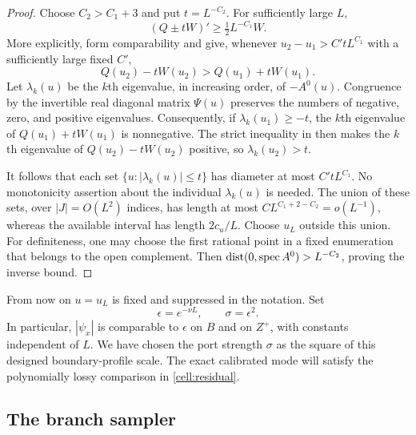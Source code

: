 \begin{proof}
Choose $C_2>C_1+3$ and put $t=L^{-C_2}$.  For sufficiently large $L$,
\[
 (Q\pm tW)'\ge\tfrac12 L^{-C_1}W.
\]
More explicitly, form comparability and 
give, whenever $u_2-u_1>C'tL^{C_1}$ with a sufficiently large fixed $C'$,
\begin{equation}
 Q(u_2)-tW(u_2)>Q(u_1)+tW(u_1).
 \label{cell:inertia-comparison}
\end{equation}
Let $\lambda_k(u)$ be the $k$th eigenvalue, in increasing order, of
$-A^0(u)$.  Congruence by the invertible real diagonal matrix $\Psi(u)$
preserves the numbers of negative, zero, and positive eigenvalues.
Consequently, if $\lambda_k(u_1)\ge-t$, the $k$th eigenvalue of
$Q(u_1)+tW(u_1)$ is nonnegative.  The strict inequality
in  then makes the $k$th eigenvalue of
$Q(u_2)-tW(u_2)$ positive, so $\lambda_k(u_2)>t$.

It follows that each set
$\{u:|\lambda_k(u)|\le t\}$ has diameter at most $C'tL^{C_1}$.
No monotonicity assertion about the individual $\lambda_k(u)$ is needed.
The union of these sets, over $|J|=O(L^2)$ indices, has length at most
$C L^{C_1+2-C_2}=o(L^{-1})$, whereas the available interval has length
$2c_u/L$.  Choose $u_L$ outside this union.  For definiteness, one may
choose the first rational point in a fixed enumeration that belongs to
the open complement.  Then
$\operatorname{dist}(0,\operatorname{spec}A^0)>L^{-C_2}$, proving the inverse bound.
\end{proof}

From now on $u=u_L$ is fixed and suppressed in the notation.  Set
\begin{equation}
 \epsilon=e^{-\nu L},\qquad \sigma=\epsilon^2.
 \label{cell:epsilon}
\end{equation}
In particular, $|\psi_x|$ is comparable to $\epsilon$ on $B$ and on
$Z^+$, with constants independent of $L$. We have chosen the port strength
$\sigma$ as the square of this designed boundary-profile scale. The exact
calibrated mode will satisfy the polynomially lossy comparison in
\cref{cell:residual}.

\subsection{The branch sampler}

